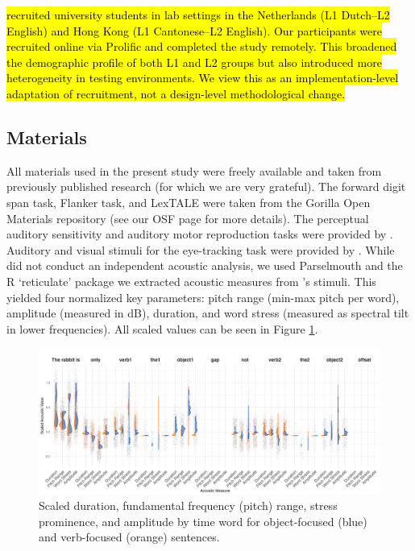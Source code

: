 \textcite{ge2021a} \hl{recruited university students in lab settings in the Netherlands (L1 Dutch–L2 English) and Hong Kong (L1 Cantonese–L2 English). Our participants were recruited online via Prolific and completed the study remotely. This broadened the demographic profile of both L1 and L2 groups but also introduced more heterogeneity in testing environments. We view this as an implementation-level adaptation of recruitment, not a design-level methodological change.}

\subsection{Materials}
All materials used in the present study were freely available and taken from previously published research (for which we are very grateful). The forward digit span task, Flanker task, and LexTALE \parencite{lemhofer2012introducing} were taken from the Gorilla \parencite{Anwyl-Irvine_2019} Open Materials repository (see our OSF page for more details). The perceptual auditory sensitivity and auditory motor reproduction tasks were provided by \textcite{Kachlicka_Saito_Tierney_2019, saito2020domain}. Auditory and visual stimuli for the eye-tracking task were provided by \textcite{ge2021a}. While \textcite{ge2021a} did not conduct an independent acoustic analysis, we used  Parselmouth \parencite{jadoul2018introducing} and the R `reticulate' package \parencite{Ushey2022} we extracted acoustic measures from \textcite{ge2021a}'s stimuli. This yielded four normalized key parameters: pitch range (min-max pitch per word), amplitude (measured in dB), duration, and word stress (measured as spectral tilt in lower frequencies). All scaled values can be seen in Figure \ref{fig:acoustic_faceted}.

\begin{figure}[H]  %
    \centering
    \includegraphics[width=\textwidth,height=\textheight,keepaspectratio]{viz/acoustic_faceted.png}
    \caption{Scaled duration, fundamental frequency (pitch) range, stress prominence, and amplitude by time word for object-focused (blue) and verb-focused (orange) sentences.}
    \label{fig:acoustic_faceted}
\end{figure}


